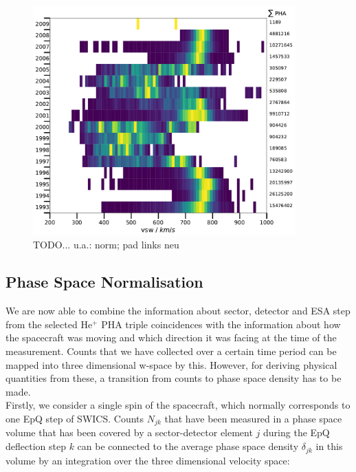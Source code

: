 \begin{figure}[h]
	\includegraphics[width=0.9\textwidth]{Figures/vsw_all_years_brw.pdf}
	\centering
	\caption{TODO... u.a.: norm; pad links neu}
	\label{fig:vsw_years}
\end{figure}


%
\subsection{Phase Space Normalisation}
We are now able to combine the information about sector, detector and ESA step from the selected $\mathrm{He^{+}}$ PHA triple coincidences with the information about how the spacecraft was moving and which direction it was facing at the time of the measurement.
Counts that we have collected over a certain time period can be mapped into three dimensional w-space by this. However, for deriving physical quantities from these, a transition from counts to phase space density has to be made.\\
Firstly, we consider a single spin of the spacecraft, which normally corresponds to one EpQ step of SWICS.
Counts $N_{jk}$ that have been measured in a phase space volume that has been covered by a sector-detector element $j$ during the EpQ deflection step $k$ can be connected to the average phase space density $\delta_{jk}$ in this volume by an integration over the three dimensional velocity space:


